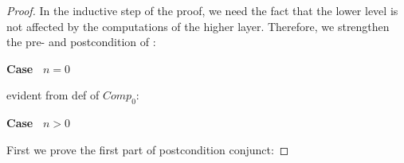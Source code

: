 \begin{proof}

In the inductive step of the proof, we need the fact that the lower level is not affected by the computations of the higher layer. Therefore, we strengthen the pre- and postcondition of : 


%
%


{\bf Case~} $n=0$


evident from def of $Comp_0$:




%

{\bf Case~} $n>0$

First we prove the first part of postcondition conjunct:


\end{proof}
